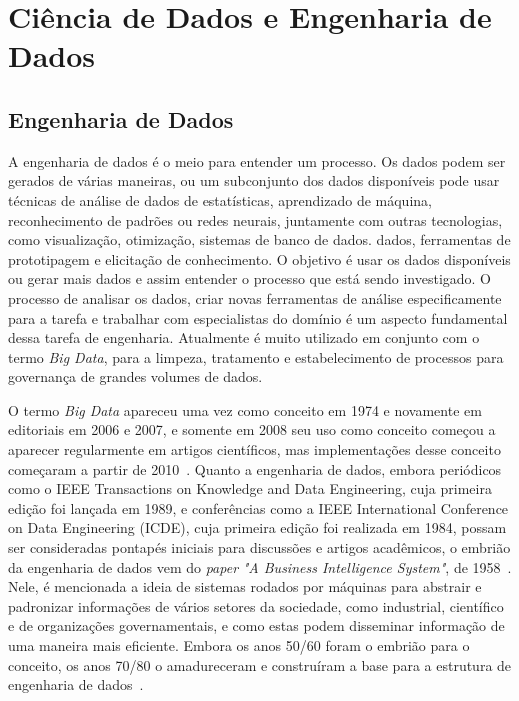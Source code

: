 \documentclass[portugues]{ic-tese}
\begin{document}
\section{Ciência de Dados e Engenharia de Dados}

\subsection{Engenharia de Dados}

A engenharia de dados é o meio para entender um processo. Os dados podem ser gerados de várias maneiras, ou um subconjunto dos dados disponíveis pode usar técnicas de análise de dados de estatísticas, aprendizado de máquina, reconhecimento de padrões ou redes neurais, juntamente com outras tecnologias, como visualização, otimização, sistemas de banco de dados. dados, ferramentas de prototipagem e elicitação de conhecimento. O objetivo é usar os dados disponíveis ou gerar mais dados e assim entender o processo que está sendo investigado. O processo de analisar os dados, criar novas ferramentas de análise especificamente para a tarefa e trabalhar com especialistas do domínio é um aspecto fundamental dessa tarefa de engenharia. Atualmente é muito utilizado em conjunto com o termo \textit{Big Data}, para a limpeza, tratamento e estabelecimento de processos para governança de grandes volumes de dados.

O termo \textit{Big Data} apareceu uma vez como conceito em 1974 e novamente em editoriais em 2006 e 2007, e somente em 2008 seu uso como conceito começou a aparecer regularmente em artigos científicos, mas implementações desse conceito começaram a partir de 2010~\citep{Raban_2020}. Quanto a engenharia de dados, embora periódicos como o IEEE Transactions on Knowledge and Data Engineering, cuja primeira edição foi lançada em 1989, e conferências como a IEEE International Conference on Data Engineering (ICDE), cuja primeira edição foi realizada em 1984, possam ser consideradas pontapés iniciais para discussões e artigos acadêmicos, o embrião da engenharia de dados vem do \textit{paper} \textit{"A Business Intelligence System"}, de 1958~\citep{Panoply_2017}. Nele, é mencionada a ideia de sistemas rodados por máquinas para abstrair e padronizar informações de vários setores da sociedade, como industrial, científico e de organizações governamentais, e como estas podem disseminar informação de uma maneira mais eficiente. Embora os anos 50/60 foram o embrião para o conceito, os anos 70/80 o amadureceram e construíram a base para a estrutura de engenharia de dados~\citep{Panoply_2017}.
\end{document}
